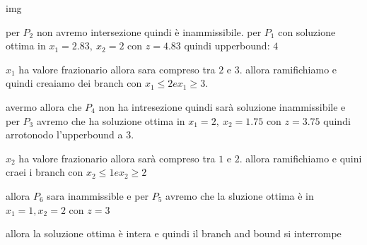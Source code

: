 img

per $P_2$ non avremo intersezione quindi è inammissibile. per $P_1$ con soluzione ottima in $x_1 = 2.83,\ x_2 = 2$ con $z = 4.83$ quindi upperbound: $4$

$x_1$ ha valore frazionario allora sara compreso tra $2$ e $3$. allora ramifichiamo e quindi creaiamo dei branch con $x_1 \leq 2 e x_1 \geq 3$.

avermo allora che $P_4$ non ha intresezione quindi sarà soluzione inammissibile e per $P_3$ avremo che ha soluzione ottima in $x_1 = 2,\ x_2 = 1.75$ con $z = 3.75$ quindi arrotonodo l'upperbound a $3$.

$x_2$ ha valore frazionario allora sarà compreso tra $1$ e $2$. allora ramifichiamo e quini craei i branch con $x_2 \leq 1 e x_2 \geq 2$

allora $P_6$ sara inammissible e per $P_5$ avremo che la sluzione ottima è in $x_1 = 1, x_2 = 2$ con $z = 3$

allora la soluzione ottima è intera e quindi il branch and bound si interrompe
